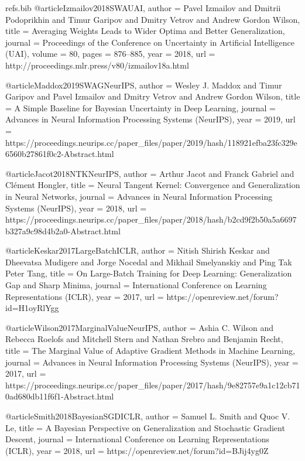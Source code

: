 \begin{filecontents*}{refs.bib}
@article{Izmailov2018SWAUAI,
  author = {Pavel Izmailov and Dmitrii Podoprikhin and Timur Garipov and Dmitry Vetrov and Andrew Gordon Wilson},
  title = {Averaging Weights Leads to Wider Optima and Better Generalization},
  journal = {Proceedings of the Conference on Uncertainty in Artificial Intelligence (UAI)},
  volume = {80},
  pages = {876--885},
  year = {2018},
  url = {http://proceedings.mlr.press/v80/izmailov18a.html}
}

@article{Maddox2019SWAGNeurIPS,
  author = {Wesley J. Maddox and Timur Garipov and Pavel Izmailov and Dmitry Vetrov and Andrew Gordon Wilson},
  title = {A Simple Baseline for Bayesian Uncertainty in Deep Learning},
  journal = {Advances in Neural Information Processing Systems (NeurIPS)},
  year = {2019},
  url = {https://proceedings.neurips.cc/paper_files/paper/2019/hash/118921efba23fc329e6560b27861f0c2-Abstract.html}
}

@article{Jacot2018NTKNeurIPS,
  author = {Arthur Jacot and Franck Gabriel and Clément Hongler},
  title = {Neural Tangent Kernel: Convergence and Generalization in Neural Networks},
  journal = {Advances in Neural Information Processing Systems (NeurIPS)},
  year = {2018},
  url = {https://proceedings.neurips.cc/paper_files/paper/2018/hash/b2cd9f2b50a5a6697b327a9c98d4b2a0-Abstract.html}
}

@article{Keskar2017LargeBatchICLR,
  author = {Nitish Shirish Keskar and Dheevatsa Mudigere and Jorge Nocedal and Mikhail Smelyanskiy and Ping Tak Peter Tang},
  title = {On Large-Batch Training for Deep Learning: Generalization Gap and Sharp Minima},
  journal = {International Conference on Learning Representations (ICLR)},
  year = {2017},
  url = {https://openreview.net/forum?id=H1oyRlYgg}
}

@article{Wilson2017MarginalValueNeurIPS,
  author = {Ashia C. Wilson and Rebecca Roelofs and Mitchell Stern and Nathan Srebro and Benjamin Recht},
  title = {The Marginal Value of Adaptive Gradient Methods in Machine Learning},
  journal = {Advances in Neural Information Processing Systems (NeurIPS)},
  year = {2017},
  url = {https://proceedings.neurips.cc/paper_files/paper/2017/hash/9e82757e9a1c12cb710ad680db11f6f1-Abstract.html}
}

@article{Smith2018BayesianSGDICLR,
  author = {Samuel L. Smith and Quoc V. Le},
  title = {A Bayesian Perspective on Generalization and Stochastic Gradient Descent},
  journal = {International Conference on Learning Representations (ICLR)},
  year = {2018},
  url = {https://openreview.net/forum?id=BJij4yg0Z}
}


\end{filecontents*}
